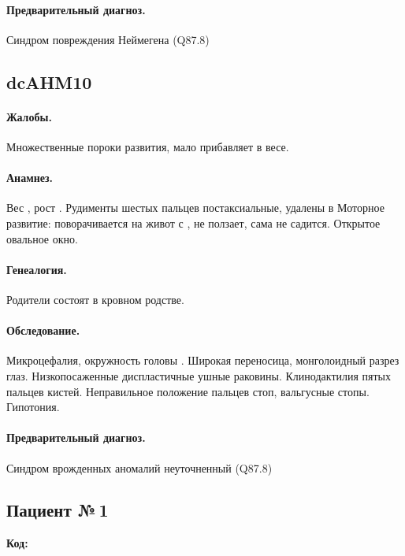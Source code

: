 \documentclass[a4paper,14pt]{extarticle}
\newcommand{\gramm}{г}
\newcommand{\cm}{см}
\newcommand{\months}{мес.}
\begin{document}
\paragraph{Предварительный диагноз.}
Синдром повреждения Неймегена (Q87.8)

\subsection*{dcAHM10}

\paragraph{Жалобы.}
Множественные пороки развития, мало прибавляет в весе.

\paragraph{Анамнез.}
Вес \numprint[\gramm]{3410}, рост \numprint[\cm]{53}.
Рудименты шестых пальцев постаксиальные, удалены в \numprint[\months]{6}
Моторное развитие: поворачивается на живот с \numprint[\months]{6}, не ползает, сама не садится.
Открытое овальное окно.

\paragraph{Генеалогия.}
Родители состоят в кровном родстве.

\paragraph{Обследование.}
Микроцефалия, окружность головы \numprint[\cm]{42}.
Широкая переносица, монголоидный разрез глаз.
Низкопосаженные диспластичные ушные раковины.
Клинодактилия пятых пальцев кистей.
Неправильное положение пальцев стоп, вальгусные стопы.
Гипотония.

\paragraph{Предварительный диагноз.}
Синдром врожденных аномалий неуточненный (Q87.8)

\setlength{\parindent}{0cm}

\newpage
\subsection*{Пациент №\,1}

\textbf{Код:} 
\end{document}
